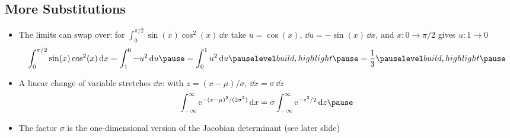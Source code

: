 \begin{slide}
\section[-2]{More Substitutions}

\begin{PauseHighLight}
  \begin{itemize}
  \item The limits can swap over: for $\int_0^{\pi/2} \sin(x)\cos^2(x)\,\dd x$
    take $u = \cos(x)$, $\dd u = -\sin(x)\,\dd x$, and $x: 0\to\pi/2$
    gives $u: 1\to0$\pause
    \begin{align*}
      \int_0^{\pi/2} \sin(x)\cos^2(x)\,\dd x = \int_1^0 -u^2\,\dd u\pause
      = \int_0^1 u^2\,\dd u\pauseb = \frac13\pauseb
    \end{align*}
  \item A linear change of variable stretches $\dd x$: with
    $z = (x-\mu)/\sigma$, $\dd x = \sigma\,\dd z$\pause
    \begin{align*}
      \int_{-\infty}^\infty \e{-(x-\mu)^2/(2\sigma^2)}\,\dd x
      = \sigma\int_{-\infty}^\infty \e{-z^2/2}\,\dd z\pause
    \end{align*}
  \item The factor $\sigma$ is the one-dimensional version of the
    Jacobian determinant (see later slide)\pause
  \end{itemize}
\end{PauseHighLight}

\end{slide}


